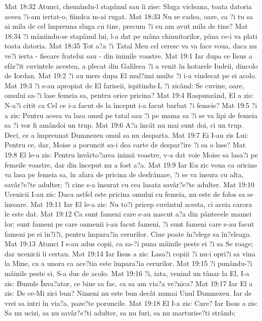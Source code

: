 Mat 18:32  Atunci, chemându-l stapânul sau îi zise: Sluga vicleana, toata datoria aceea ?i-am iertat-o, fiindca m-ai rugat.
Mat 18:33  Nu se cadea, oare, ca ?i tu sa ai mila de cel împreuna sluga cu tine, precum ?i eu am avut mila de tine?
Mat 18:34  ?i mâniindu-se stapânul lui, l-a dat pe mâna chinuitorilor, pâna ce-i va plati toata datoria.
Mat 18:35  Tot a?a ?i Tatal Meu cel ceresc va va face voua, daca nu ve?i ierta - fiecare fratelui sau - din inimile voastre.
Mat 19:1  Iar dupa ce Iisus a sfâr?it cuvintele acestea, a plecat din Galileea ?i a venit în hotarele Iudeii, dincolo de Iordan.
Mat 19:2  ?i au mers dupa El mul?imi multe ?i i-a vindecat pe ei acolo.
Mat 19:3  ?i s-au apropiat de El fariseii, ispitindu-L ?i zicând: Se cuvine, oare, omului sa-?i lase femeia sa, pentru orice pricina?
Mat 19:4  Raspunzând, El a zis: N-a?i citit ca Cel ce i-a facut de la început i-a facut barbat ?i femeie?
Mat 19:5  ?i a zis: Pentru aceea va lasa omul pe tatal sau ?i pe mama sa ?i se va lipi de femeia sa ?i vor fi amândoi un trup.
Mat 19:6  A?a încât nu mai sunt doi, ci un trup. Deci, ce a împreunat Dumnezeu omul sa nu desparta.
Mat 19:7  Ei I-au zis Lui: Pentru ce, dar, Moise a poruncit sa-i dea carte de despar?ire ?i sa o lase?
Mat 19:8  El le-a zis: Pentru învârto?area inimii voastre, v-a dat voie Moise sa lasa?i pe femeile voastre, dar din început nu a fost a?a.
Mat 19:9  Iar Eu zic voua ca oricine va lasa pe femeia sa, în afara de pricina de desfrânare, ?i se va însura cu alta, savâr?e?te adulter; ?i cine s-a însurat cu cea lasata savâr?e?te adulter.
Mat 19:10  Ucenicii I-au zis: Daca astfel este pricina omului cu femeia, nu este de folos sa se însoare.
Mat 19:11  Iar El le-a zis: Nu to?i pricep cuvântul acesta, ci aceia carora le este dat.
Mat 19:12  Ca sunt fameni care s-au nascut a?a din pântecele mamei lor; sunt fameni pe care oamenii i-au facut fameni, ?i sunt fameni care s-au facut fameni pe ei în?i?i, pentru împara?ia cerurilor. Cine poate în?elege sa în?eleaga.
Mat 19:13  Atunci I s-au adus copii, ca sa-?i puna mâinile peste ei ?i sa Se roage; dar ucenicii îi certau.
Mat 19:14  Iar Iisus a zis: Lasa?i copiii ?i nu-i opri?i sa vina la Mine, ca a unora ca ace?tia este împara?ia cerurilor.
Mat 19:15  ?i punându-?i mâinile peste ei, S-a dus de acolo.
Mat 19:16  ?i, iata, venind un tânar la El, I-a zis: Bunule Înva?ator, ce bine sa fac, ca sa am via?a ve?nica?
Mat 19:17  Iar El a zis: De ce-Mi zici bun? Nimeni nu este bun decât numai Unul Dumnezeu. Iar de vrei sa intri în via?a, paze?te poruncile.
Mat 19:18  El I-a zis: Care? Iar Iisus a zis: Sa nu ucizi, sa nu savâr?e?ti adulter, sa nu furi, sa nu marturise?ti strâmb;
